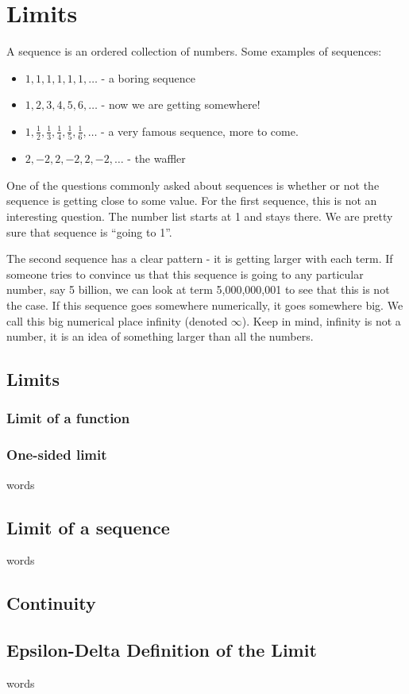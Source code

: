 \chapter{Limits}
A sequence is an ordered collection of numbers.  Some examples of sequences:
\begin{itemize}
\item $1,1,1,1,1,1,\ldots$ - a boring sequence
\item $1,2,3,4,5,6,\ldots$ - now we are getting somewhere!
\item $1,\frac{1}{2}, \frac{1}{3},\frac{1}{4},\frac{1}{5},\frac{1}{6},\ldots$ - a very famous sequence, more to come.
\item $2,-2,2,-2,2,-2, \ldots$ - the waffler
\end{itemize}
One of the questions commonly asked about sequences is whether or not the sequence is getting close to some value.  For the first sequence, this is not an interesting question.  The number list starts at 1 and stays there.  We are pretty sure that sequence is ``going to 1''.

The second sequence has a clear pattern - it is getting larger with each term.  If someone tries to convince us that this sequence is going to any particular number, say 5 billion, we can look at term 5,000,000,001 to see that this is not the case.  If this sequence goes somewhere numerically, it goes somewhere big.  We call this big numerical place infinity (denoted $\infty$).  Keep in mind, infinity is not a number, it is an idea of something larger than all the numbers.

\section{Limits}


\subsection{Limit of a function}


\subsection{One-sided limit}
words

\section{Limit of a sequence}
words

\section{Continuity}



\section{Epsilon-Delta Definition of the Limit}
words
